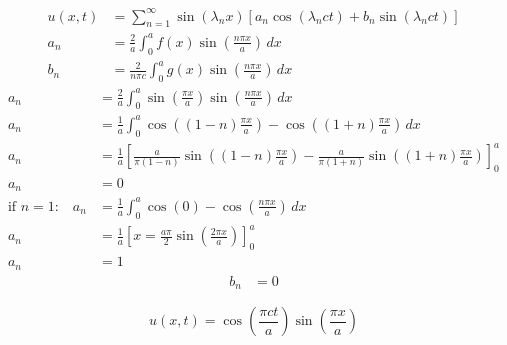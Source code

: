 \documentclass[../../HW06.tex]{subfiles}
\begin{document}
\begin{align*}
    u(x,t) & =\sum_{n=1}^{\infty}\sin(\lambda_{n}x)\left[ a_{n}\cos(\lambda_{n}ct) + b_{n}\sin(\lambda_{n}ct) \right] \\
    a_{n}  & = \frac{2}{a} \int_{0}^{a} f(x) \sin\left(\frac{n\pi x}{a}\right)\,dx                                    \\
    b_{n}  & = \frac{2}{n\pi c} \int_{0}^{a} g(x) \sin\left( \frac{n\pi x}{a} \right)\,dx
\end{align*}
\begin{align*}
    a_{n}                       & = \frac{2}{a}\int_{0}^{a} \sin\left( \frac{\pi x}{a} \right)\sin\left( \frac{n \pi x}{a} \right)\,dx                                                          \\
    a_{n}                       & = \frac{1}{a} \int_{0}^{a} \cos\left( (1-n) \frac{\pi x}{a} \right) - \cos\left( (1+n) \frac{\pi x}{a} \right)\,dx                                            \\
    a_{n}                       & = \frac{1}{a} \left[ \frac{a}{\pi(1-n)} \sin\left( (1-n) \frac{\pi x}{a} \right) - \frac{a}{\pi(1+n)}\sin\left( (1+n) \frac{\pi x}{a} \right) \right]_{0}^{a} \\
    a_{n}                       & = 0                                                                                                                                                           \\
    \text{if $n=1$:}\quad a_{n} & = \frac{1}{a} \int_{0}^{a} \cos(0) - \cos\left( \frac{n\pi x}{a} \right)\,dx                                                                                  \\
    a_{n}                       & = \frac{1}{a} \left[ x = \frac{a\pi}{2}\sin\left( \frac{2\pi x}{a} \right) \right]_{0}^{a}                                                                    \\
    a_{n}                       & = 1
\end{align*}
\begin{align*}
    b_{n} & = 0
\end{align*}
\begin{center}
    \[
        u(x,t) = \boxed{\cos\left(\frac{\pi ct}{a}\right)\sin\left( \frac{\pi x}{a} \right)}
    \]
\end{center}
\end{document}
